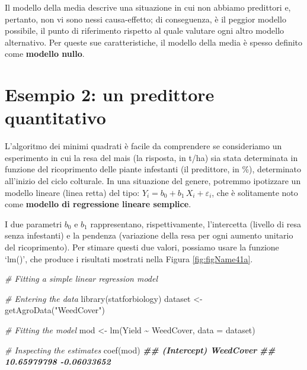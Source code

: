 \documentclass[
  12pt,
]{book}
\newenvironment{Shaded}{\begin{snugshade}}{\end{snugshade}}
\newcommand{\AttributeTok}[1]{\textcolor[rgb]{0.77,0.63,0.00}{#1}}
\newcommand{\CommentTok}[1]{\textcolor[rgb]{0.56,0.35,0.01}{\textit{#1}}}
\newcommand{\DocumentationTok}[1]{\textcolor[rgb]{0.56,0.35,0.01}{\textbf{\textit{#1}}}}
\newcommand{\FunctionTok}[1]{\textcolor[rgb]{0.00,0.00,0.00}{#1}}
\newcommand{\NormalTok}[1]{#1}
\newcommand{\OtherTok}[1]{\textcolor[rgb]{0.56,0.35,0.01}{#1}}
\newcommand{\SpecialCharTok}[1]{\textcolor[rgb]{0.00,0.00,0.00}{#1}}
\newcommand{\StringTok}[1]{\textcolor[rgb]{0.31,0.60,0.02}{#1}}
\begin{document}
Il modello della media descrive una situazione in cui non abbiamo predittori e, pertanto, non vi sono nessi causa-effetto; di conseguenza, è il peggior modello possibile, il punto di riferimento rispetto al quale valutare ogni altro modello alternativo. Per queste sue caratteristiche, il modello della media è spesso definito come \textbf{modello nullo}.

\hypertarget{esempio-2-un-predittore-quantitativo}{%
\section{Esempio 2: un predittore quantitativo}\label{esempio-2-un-predittore-quantitativo}}

L'algoritmo dei minimi quadrati è facile da comprendere se consideriamo un esperimento in cui la resa del mais (la risposta, in t/ha) sia stata determinata in funzione del ricoprimento delle piante infestanti (il predittore, in \%), determinato all'inizio del ciclo colturale. In una situazione del genere, potremmo ipotizzare un modello lineare (linea retta) del tipo: \(Y_i = b_0 + b_1 \, X_i + \varepsilon_i\), che è solitamente noto come \textbf{modello di regressione lineare semplice}.

I due parametri \(b_0\) e \(b_1\) rappresentano, rispettivamente, l'intercetta (livello di resa senza infestanti) e la pendenza (variazione della resa per ogni aumento unitario del ricoprimento). Per stimare questi due valori, possiamo usare la funzione `lm()', che produce i risultati mostrati nella Figura \ref{fig:figName41a}.

\begin{Shaded}
\begin{Highlighting}[]
\CommentTok{\# Fitting a simple linear regression model}

\CommentTok{\# Entering the data}
\FunctionTok{library}\NormalTok{(statforbiology)}
\NormalTok{dataset }\OtherTok{\textless{}{-}} \FunctionTok{getAgroData}\NormalTok{(}\StringTok{"WeedCover"}\NormalTok{)}

\CommentTok{\# Fitting the model}
\NormalTok{mod }\OtherTok{\textless{}{-}} \FunctionTok{lm}\NormalTok{(Yield }\SpecialCharTok{\textasciitilde{}}\NormalTok{ WeedCover, }\AttributeTok{data =}\NormalTok{ dataset)}

\CommentTok{\# Inspecting the estimates}
\FunctionTok{coef}\NormalTok{(mod)}
\DocumentationTok{\#\# (Intercept)   WeedCover }
\DocumentationTok{\#\# 10.65979798 {-}0.06033652}
\end{Highlighting}
\end{Shaded}
\end{document}
